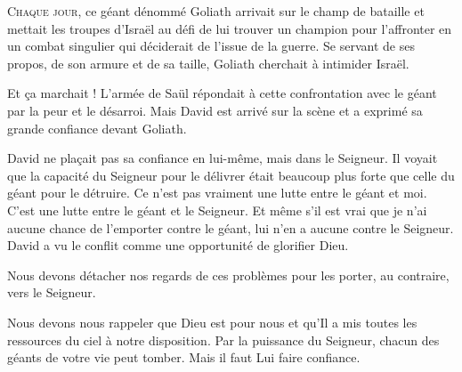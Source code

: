 


\lettrine{C}{haque jour}, ce géant dénommé Goliath arrivait
 sur le champ de bataille et mettait les troupes d'Israël
 au défi de lui trouver un champion pour l'affronter
 en un combat singulier qui déciderait de l'issue de la guerre.
 Se servant de ses propos, de son armure et de sa taille,
 Goliath cherchait à intimider Israël. 

Et \c{c}a marchait ! L'armée de Saül répondait à cette confrontation
 avec le géant par la peur et le désarroi.
 Mais David est arrivé sur la scène et a exprimé
 sa grande confiance devant Goliath.

David ne pla\c{c}ait pas sa confiance en lui-même, mais dans le Seigneur.
 Il voyait que la capacité du Seigneur pour le délivrer était
 beaucoup plus forte que celle du géant pour le détruire.
 \Og Ce n'est pas vraiment une lutte entre le géant et moi.
 C'est une lutte entre le géant et le Seigneur.
 Et même s'il est vrai que je n'ai aucune chance de l'emporter contre le géant,
 lui n'en a aucune contre le Seigneur. \Fg{}
 David a vu le conflit comme une opportunité de glorifier Dieu.


Nous devons détacher nos regards de ces problèmes pour les porter,
 au contraire, vers le Seigneur.

Nous devons nous rappeler que Dieu est pour nous et qu'Il a mis
 toutes les ressources du ciel à notre disposition.
 Par la puissance du Seigneur, chacun des géants de votre vie peut tomber.
 Mais il faut Lui faire confiance. 

\dvrule





